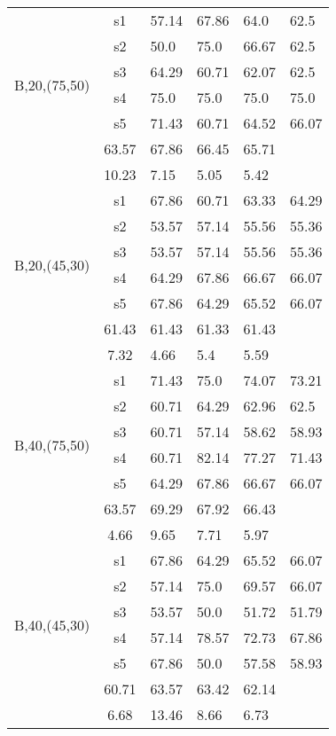 \begin{table}[h]
{\begin{tabular}{cc|llll}
\multirow{6}{*}{\begin{sideways}B,20,(75,50)\end{sideways}} & s1 & 57.14 & 67.86 & 64.0 & 62.5 \\
 & s2 & 50.0 & 75.0 & 66.67 & 62.5 \\
 & s3 & 64.29 & 60.71 & 62.07 & 62.5 \\
 & s4 & 75.0 & 75.0 & 75.0 & 75.0 \\
 & s5 & 71.43 & 60.71 & 64.52 & 66.07 \\
\rowcolor{lightgray!50}\multicolumn{2}{r|}{avg} & 63.57 & 67.86 & 66.45 & 65.71 \\
\rowcolor{lightgray!50}\multicolumn{2}{r|}{std} & 10.23 & 7.15 & 5.05 & 5.42 \\
\multirow{6}{*}{\begin{sideways}B,20,(45,30)\end{sideways}} & s1 & 67.86 & 60.71 & 63.33 & 64.29 \\
 & s2 & 53.57 & 57.14 & 55.56 & 55.36 \\
 & s3 & 53.57 & 57.14 & 55.56 & 55.36 \\
 & s4 & 64.29 & 67.86 & 66.67 & 66.07 \\
 & s5 & 67.86 & 64.29 & 65.52 & 66.07 \\
\rowcolor{lightgray!50}\multicolumn{2}{r|}{avg} & 61.43 & 61.43 & 61.33 & 61.43 \\
\rowcolor{lightgray!50}\multicolumn{2}{r|}{std} & 7.32 & 4.66 & 5.4 & 5.59 \\
\multirow{6}{*}{\begin{sideways}B,40,(75,50)\end{sideways}} & s1 & 71.43 & 75.0 & 74.07 & 73.21 \\
 & s2 & 60.71 & 64.29 & 62.96 & 62.5 \\
 & s3 & 60.71 & 57.14 & 58.62 & 58.93 \\
 & s4 & 60.71 & 82.14 & 77.27 & 71.43 \\
 & s5 & 64.29 & 67.86 & 66.67 & 66.07 \\
\rowcolor{lightgray!50}\multicolumn{2}{r|}{avg} & 63.57 & 69.29 & 67.92 & 66.43 \\
\rowcolor{lightgray!50}\multicolumn{2}{r|}{std} & 4.66 & 9.65 & 7.71 & 5.97 \\
\multirow{6}{*}{\begin{sideways}B,40,(45,30)\end{sideways}} & s1 & 67.86 & 64.29 & 65.52 & 66.07 \\
 & s2 & 57.14 & 75.0 & 69.57 & 66.07 \\
 & s3 & 53.57 & 50.0 & 51.72 & 51.79 \\
 & s4 & 57.14 & 78.57 & 72.73 & 67.86 \\
 & s5 & 67.86 & 50.0 & 57.58 & 58.93 \\
\rowcolor{lightgray!50}\multicolumn{2}{r|}{avg} & 60.71 & 63.57 & 63.42 & 62.14 \\
\rowcolor{lightgray!50}\multicolumn{2}{r|}{std} & 6.68 & 13.46 & 8.66 & 6.73
\end{tabular}}
\end{table}

